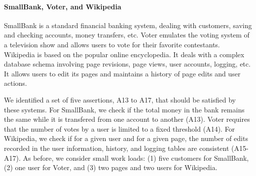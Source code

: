 %

\paragraph{SmallBank, Voter, and Wikipedia} 
SmallBank is a standard financial banking system, dealing with customers, saving
and checking accounts, money transfers, etc.  
Voter emulates the voting system of a television show and allows users to vote for their favorite contestants.
Wikipedia is based on the popular online encyclopedia. It deals with a complex database schema involving 
page revisions, page views, user accounts, logging, etc.  
It allows users to edit its pages and maintains a history of page edits and user actions. 

We identified a set of five assertions, A13 to A17, that should be satisfied by these systems.  
For SmallBank, we check if the total money in the bank remains the same while it
is transfered from one account to another (A13). 
Voter requires that the number of votes by a user is limited to a fixed threshold (A14).  
For Wikipedia, we check if for a given user and for a given page, the number of
edits recorded in the user information, history, and logging tables
are consistent (A15-A17). 
As before, we consider small work loads: (1) five customers for SmallBank, (2) one user for Voter, and (3) two pages and two users for Wikipedia.  

